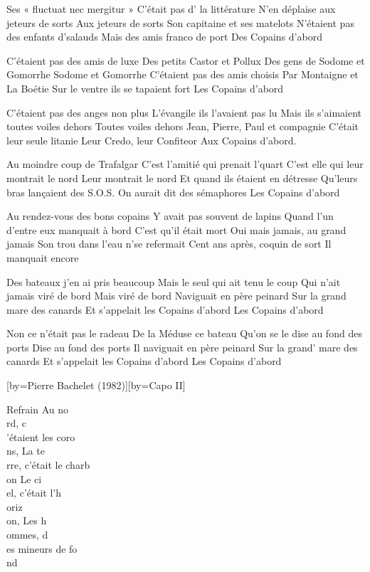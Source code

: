 \beginverse
Ses « fluctuat nec mergitur »
C'était pas d' la littérature
N'en déplaise aux jeteurs de sorts
Aux jeteurs de sorts
Son capitaine et ses matelots
N'étaient pas des enfants d'salauds
Mais des amis franco de port
Des Copains d'abord
\endverse

\beginverse
C'étaient pas des amis de luxe
Des petits Castor et Pollux
Des gens de Sodome et Gomorrhe
Sodome et Gomorrhe
C'étaient pas des amis choisis
Par Montaigne et La Boétie
Sur le ventre ils se tapaient fort
Les Copains d'abord
\endverse

\beginverse
C'étaient pas des anges non plus
L'évangile ils l'avaient pas lu
Mais ils s'aimaient toutes voiles dehors
Toutes voiles dehors
Jean, Pierre, Paul et compagnie
C'était leur seule litanie
Leur Credo, leur Confiteor
Aux Copains d'abord.
\endverse

\beginverse
Au moindre coup de Trafalgar
C'est l'amitié qui prenait l'quart
C'est elle qui leur montrait le nord
Leur montrait le nord 
Et quand ils étaient en détresse
Qu'leurs bras lançaient des S.O.S.
On aurait dit des sémaphores
Les Copains d'abord
\endverse

\beginverse
Au rendez-vous des bons copains
Y avait pas souvent de lapins
Quand l'un d'entre eux manquait à bord
C'est qu'il était mort
Oui mais jamais, au grand jamais
Son trou dans l'eau n'se refermait
Cent ans après, coquin de sort
Il manquait encore
\endverse

\beginverse
Des bateaux j'en ai pris beaucoup
Mais le seul qui ait tenu le coup
Qui n'ait jamais viré de bord
Mais viré de bord
Naviguait en père peinard
Sur la grand mare des canards
Et s'appelait les Copains d'abord
Les Copains d'abord
\endverse

\beginverse
Non ce n'était pas le radeau
De la Méduse ce bateau
Qu'on se le dise au fond des ports
Dise au fond des ports
Il naviguait en père peinard
Sur la grand' mare des canards
Et s'appelait les Copains d'abord
Les Copains d'abord
\endverse

[by={Pierre Bachelet (1982)}][by={Capo II}]

	Refrain
Au no\\[Sol]rd, c\\[Ré]'étaient les coro\\[Sol]ns,
La te\\[Ré]rre, c'était le charb\\[Mim]on
Le ci\\[Do]el, c'était l'h\\[Ré]oriz\\[Sol]on,
Les h\\[Ré]ommes, d\\[Si7]es mineurs de fo\\[Mim]nd

